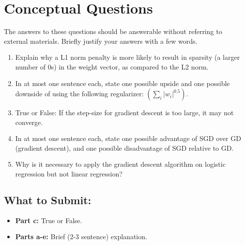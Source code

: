 \documentclass{article}
\begin{document}
\begin{sloppypar}

\clearpage{}

\section*{Conceptual Questions}

\begin{aprob}
    The answers to these questions should be answerable without referring to external materials.
    Briefly justify your answers with a few words.
    \begin{enumerate}
      \item {} Explain why a L1 norm penalty is more likely to result in sparsity (a larger number of 0s) in the weight vector, as compared to the L2 norm.
      \item {} In at most one sentence each, state one possible upside and one possible downside of using the following regularizer: $\left(\sum_{i}\left|w_{i}\right|^{0.5}\right)$.
      \item {} True or False: If the step-size for gradient descent is too large, it may not converge.
      \item {} In at most one sentence each, state one possible advantage of SGD over GD (gradient descent), and one possible disadvantage of SGD relative to GD.
      \item {} Why is it necessary to apply the gradient descent algorithm on logistic regression but not linear regression?
    \end{enumerate}
    
    \subsection*{What to Submit:}
    \begin{itemize}
        \item \textbf{Part c:} True or False. 
        \item \textbf{Parts a-e:} Brief (2-3 sentence) explanation.
    \end{itemize}
    

\end{aprob}
\end{sloppypar}
\end{document}
